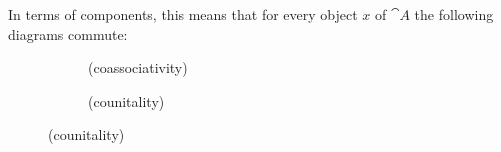 \begin{definition}[comonad]
In terms of components, this means that for every object $x$ of $\cat{A}$
the following diagrams commute:

\begin{figure}[H]
\centering
\begin{subfigure}{0.4\textwidth}
\centering
\caption*{(coassociativity)}
\end{subfigure}
\hspace{2em}
\begin{subfigure}{0.4\textwidth}
\centering
\caption*{(counitality)}
\end{subfigure}
\end{figure}

\end{definition}
